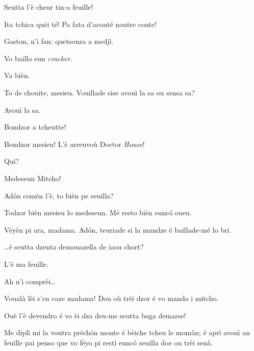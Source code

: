 \begin{drama}
\Casimirspeaks Seutta l’è cheur tin-a feuille!

\Gerominespeaks Ita tchica quèi té! Pa fata d'acouté noutre conte!

\PersEmpourtantaspeaks {} Gaston, n’i fan: quetsouza a medjì.

\Eunfeurmispeaks Vo baillo eun \textit{cracker}. 

\PersEmpourtantaspeaks Va bièn.

\Eunfeurmispeaks To de chouite, mesieu. Vouillade sise avouì la sa ou sensa sa?

\PersEmpourtantaspeaks Avouì la sa. 



\MedMitchospeaks Bondzor a tcheutte!

\Eunfeurmispeaks  Bondzor mesieu! L'è arreuvoù Doctor \textit{House}!

\Casimirspeaks Qui?

\Eunfeurmispeaks Medeseun Mitcho!

\MedMitchospeaks Ad\'on comèn l'è, to bièn pe seuilla?

\Gerominespeaks Todzor bièn mesieu lo medeseun. Mé resto bièn eunc\'o oueu.

\MedMitchospeaks Véyèn pi ara, madama. Ad\'on, teuriade si la mandze é baillade-mé lo bri.


\MedMitchospeaks{} \ldots é seutta dzenta demouazella de iaou chort?

\Gerominespeaks L’è ma feuille.

\MedMitchospeaks Ah n’i comprèi\ldots


\MedMitchospeaks Voualà lèi s’en caze madama! Dou où trèi dzor é vo mando i mitcho.

\Gerominespeaks Ouè l’è devendro é vo èi dza deu-me seutta baga demarse!

\MedMitchospeaks Me diplì mi la voutra préch\'on monte é bèiche tcheu le momàn; é aprì avouì an feuille pai penso que vo féyo pi restì eunc\'o seuilla doe ou trèi senâ.


\end{drama}

